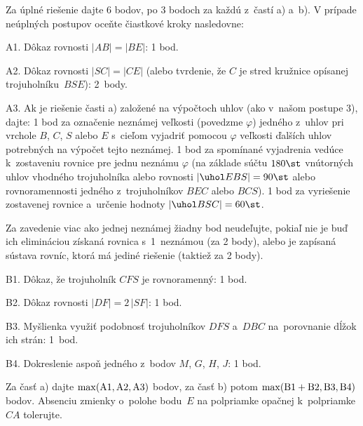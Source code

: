 {\schemaABC
Za úplné riešenie dajte 6 bodov, po 3 bodoch za každú z~častí a) a~b).
V prípade neúplných postupov oceňte čiastkové kroky nasledovne:

\smallskip\noindent
\item{A1.} Dôkaz rovnosti $|AB|=|BE|$: 1 bod.
\item{A2.} Dôkaz rovnosti $|SC|=|CE|$ (alebo tvrdenie, že $C$ je stred kružnice opísanej trojuholníku~$BSE$): 2~body.
\item{A3.} Ak je riešenie časti a) založené na výpočtoch uhlov (ako v~našom postupe 3), dajte:
\itemitem{$\triangleright$} 1 bod za označenie neznámej veľkosti (povedzme $\varphi$) jedného z~uhlov pri vrchole $B$, $C$, $S$ alebo $E$ s~cieľom vyjadriť pomocou $\varphi$ veľkosti ďalších uhlov potrebných na výpočet tejto neznámej.
\itemitem{$\triangleright$} 1 bod za spomínané vyjadrenia vedúce k~zostaveniu rovnice pre jednu neznámu $\varphi$ (na základe súčtu $180\st$ vnútorných uhlov vhodného trojuholníka alebo rovnosti $|\uhol EBS|=90\st$ alebo rovnoramennosti jedného z~trojuholníkov $BEC$ alebo $BCS$).
\itemitem{$\triangleright$} 1 bod za vyriešenie zostavenej rovnice a~určenie hodnoty $|\uhol BSC|=60\st$.
\item{} Za zavedenie viac ako jednej neznámej žiadny bod neudeľujte, pokiaľ nie je buď ich elimináciou získaná rovnica s~1~neznámou (za 2 body), alebo je zapísaná sústava rovníc, ktorá má jediné riešenie (taktiež za 2 body).
\item{B1.} Dôkaz, že trojuholník $CFS$ je rovnoramenný: 1 bod.
\item{B2.} Dôkaz rovnosti $|DF|=2\,|SF|$: 1 bod.
\item{B3.} Myšlienka využiť podobnosť trojuholníkov $DFS$ a~$DBC$ na~porovnanie dĺžok ich strán: 1~bod.
\item{B4.} Dokreslenie aspoň jedného z~bodov $M$, $G$, $H$, $J$: 1 bod.

\smallskip\noindent
Za časť a) dajte $\rm\max(A1,A2,A3)$ bodov, za časť b) potom
$\rm\max(B1+B2,B3,B4)$ bodov. Absenciu zmienky o~polohe bodu~$E$
na polpriamke opačnej k~polpriamke $CA$ tolerujte.
\endschema
}

